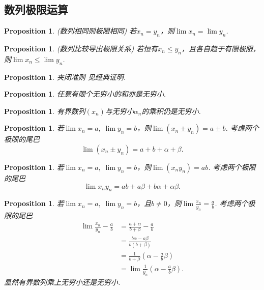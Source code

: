 \documentclass{article}
\newtheorem{proposition}[theorem]{Proposition}
\begin{document}
\subsection{数列极限运算}

\begin{proposition}
\rm {\color{red} (数列相同则极限相同)} 若$x_n = y_n$，则$\lim x_n = \lim y_n$.
\end{proposition}

\begin{proposition}
\rm {\color{red} (数列比较导出极限关系)} 若恒有$x_n \leq y_n$，且各自趋于有限极限，则$\lim x_n \leq \lim y_n$.
\end{proposition}

\begin{proposition}
\rm {\color{red} 夹闭准则} {\color{blue} 见经典证明}.
\end{proposition}

\begin{proposition}
\rm 任意有限个无穷小的和亦是无穷小.
\end{proposition}

\begin{proposition}
\rm 有界数列$(x_n)$与无穷小${\alpha_n}$的乘积仍是无穷小.
\end{proposition}

\begin{proposition}
\rm 若$\lim x_n = a,\; \lim y_n =b$，则$\lim(x_n\pm y_n) = a \pm b$. 考虑两个极限的尾巴
$$
\lim (x_n \pm y_n) = a+b+ \alpha + \beta.
$$
\end{proposition}

\begin{proposition}
\rm 若$\lim x_n = a,\; \lim y_n =b$，则$\lim(x_ny_n) = ab$. 考虑两个极限的尾巴
$$
\lim x_ny_n = ab + a\beta + b\alpha + \alpha\beta.
$$
\end{proposition}


\begin{proposition}
\rm 若$\lim x_n = a,\; \lim y_n =b$，且$b\neq 0$，则$\lim \frac{x_n}{y_n} = \frac{a}{b}$. 考虑两个极限的尾巴
$$
\begin{array}{ll}
\lim \frac{x_n}{y_n} - \frac{a}{b} &= \frac{a+\alpha}{b+\beta} - \frac{a}{b} \\
&= \frac{b\alpha - a\beta}{b(b+\beta)} \\
&= \frac{1}{b+\beta}(\alpha-\frac{a}{b} \beta) \\
&= \lim \frac{1}{y_n}(\alpha-\frac{a}{b}\beta).
\end{array}
$$
显然{\color{blue}有界数列乘上无穷小还是无穷小}.
\end{proposition}
\end{document}
